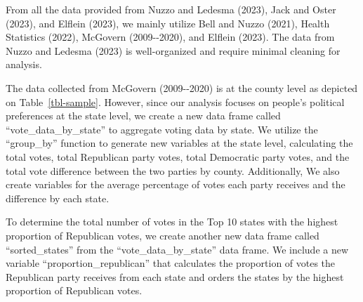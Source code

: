 \documentclass[
  letterpaper,
  DIV=11,
  numbers=noendperiod]{scrartcl}
\begin{document}
From all the data provided from Nuzzo and Ledesma (2023), Jack and Oster
(2023), and Elflein (2023), we mainly utilize Bell and Nuzzo (2021),
Health Statistics (2022), McGovern (2009-\/-2020), and Elflein (2023).
The data from Nuzzo and Ledesma (2023) is well-organized and require
minimal cleaning for analysis.

The data collected from McGovern (2009-\/-2020) is at the county level
as depicted on Table~\ref{tbl-sample}. However, since our analysis
focuses on people's political preferences at the state level, we create
a new data frame called ``vote\_data\_by\_state'' to aggregate voting
data by state. We utilize the ``group\_by'' function to generate new
variables at the state level, calculating the total votes, total
Republican party votes, total Democratic party votes, and the total vote
difference between the two parties by county. Additionally, We also
create variables for the average percentage of votes each party receives
and the difference by each state.

To determine the total number of votes in the Top 10 states with the
highest proportion of Republican votes, we create another new data frame
called ``sorted\_states'' from the ``vote\_data\_by\_state'' data frame.
We include a new variable ``proportion\_republican'' that calculates the
proportion of votes the Republican party receives from each state and
orders the states by the highest proportion of Republican votes.
\end{document}
